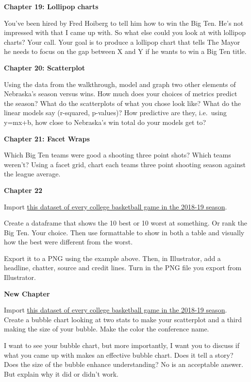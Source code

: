 \documentclass[
]{book}
\begin{document}
\textbf{Chapter 19: Lollipop charts}

You've been hired by Fred Hoiberg to tell him how to win the Big Ten. He's not impressed with that I came up with. So what else could you look at with lollipop charts? Your call. Your goal is to produce a lollipop chart that tells The Mayor he needs to focus on the gap between X and Y if he wants to win a Big Ten title.

\textbf{Chapter 20: Scatterplot}

Using the data from the walkthrough, model and graph two other elements of Nebraska's season versus wins. How much does your choices of metrics predict the season? What do the scatterplots of what you chose look like? What do the linear models say (r-squared, p-values)? How predictive are they, i.e.~using y=mx+b, how close to Nebraska's win total do your models get to?

\textbf{Chapter 21: Facet Wraps}

Which Big Ten teams were good a shooting three point shots? Which teams weren't? Using a facet grid, chart each teams three point shooting season against the league average.

\textbf{Chapter 22}

Import \href{https://unl.box.com/s/a8m91bro10t89watsyo13yjegb1fy009}{this dataset of every college basketball game in the 2018-19 season}.

Create a dataframe that shows the 10 best or 10 worst at something. Or rank the Big Ten. Your choice. Then use formattable to show in both a table and visually how the best were different from the worst.

Export it to a PNG using the example above. Then, in Illustrator, add a headline, chatter, source and credit lines. Turn in the PNG file you export from Illustrator.

\textbf{New Chapter}

Import \href{https://unl.box.com/s/a8m91bro10t89watsyo13yjegb1fy009}{this dataset of every college basketball game in the 2018-19 season}. Create a bubble chart looking at two stats to make your scatterplot and a third making the size of your bubble. Make the color the conference name.

I want to see your bubble chart, but more importantly, I want you to discuss if what you came up with makes an effective bubble chart. Does it tell a story? Does the size of the bubble enhance understanding? No is an acceptable answer. But explain why it did or didn't work.
\end{document}
